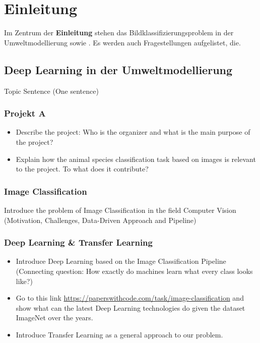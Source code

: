 \chapter{Einleitung}

Im Zentrum der \textbf{Einleitung} stehen das Bildklassifizierungsproblem in der Umweltmodellierung sowie . Es werden auch Fragestellungen aufgelistet, die.

\section{Deep Learning in der Umweltmodellierung}

Topic Sentence (One sentence)

\subsection{Projekt A}

\begin{itemize}
	\item Describe the project: Who is the organizer and what is the main purpose of the project?
	
	\item Explain how the animal species classification task based on images is relevant to the project. To what does it contribute?
\end{itemize}

\subsection{Image Classification}

Introduce the problem of Image Classification in the field Computer Vision (Motivation, Challenges, Data-Driven Approach and Pipeline)

\subsection{Deep Learning \& Transfer Learning}

\begin{itemize}
	\item Introduce Deep Learning based on the Image Classification Pipeline (Connecting question: How exactly do machines learn what every class looks like?)
	
	\item Go to this link \url{https://paperswithcode.com/task/image-classification} and show what can the latest Deep Learning technologies do given the dataset ImageNet over the years.
	
	\item Introduce Transfer Learning as a general approach to our problem.
\end{itemize}

